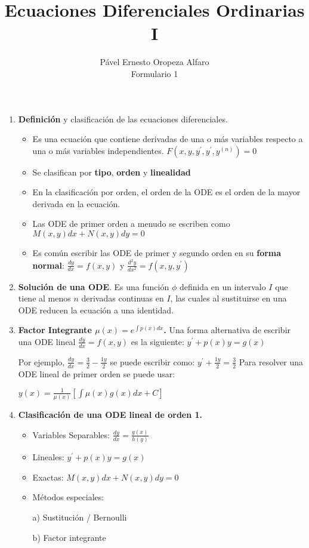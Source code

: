 \documentclass[twoside, twocolumn, 10pt]{article}
\title{Ecuaciones Diferenciales Ordinarias I}
\author{P\'avel Ernesto Oropeza Alfaro \\Formulario 1}
\begin{document}
\date{}
\maketitle
\thispagestyle{empty}
{\begin{small}
\begin{enumerate}
    \item \textbf{Definición} y clasificación de las ecuaciones diferenciales. 
\begin{itemize}
    \item Es una ecuación que contiene derivadas de una o más 
        variables respecto a una o más variables independientes.
        $F(x,y, y^{\prime},y^{\prime},y^{(n)})=0$
    \item Se clasifican por \textbf{tipo}, \textbf{orden} y \textbf{linealidad}
    \item En la clasificación por orden, el orden de la ODE es el orden de la
        mayor derivada en la ecuación.
    \item Las ODE de primer orden a menudo se escriben como 
        $M(x,y)dx + N(x,y) dy = 0$
    \item Es común escribir las ODE de primer y segundo orden en su \textbf{forma normal}:
        $\frac{dy}{dx}=f(x,y)$ y $\frac{d^{2}y}{dx^{2}}=f(x,y,y^{\prime})$
\end{itemize}

\item \textbf{Solución de una ODE}. Es una función $\phi$ definida en un intervalo $I$ que
    tiene al menos $n$ derivadas continuas en $I$, las cuales al sustituirse en
    una ODE reducen la ecuación a una identidad.

\item \textbf{Factor Integrante $\mu(x)=e^{\int p(x) dx}$.} Una forma alternativa de escribir una ODE lineal 
    $\frac{dy}{dx}=f(x,y)$ es la siguiente:
    $y^{\prime} + p(x)y=g(x)$

Por ejemplo, $\frac{dy}{dx}=\frac{3}{2}-\frac{1y}{2}$ se puede escribir como:
$y^{\prime} + \frac{1y}{2}=\frac{3}{2}$
Para resolver una ODE lineal de primer orden se puede usar: 
\begin{center}
$y(x) = \frac{1}{\mu(x)}[ \int \mu(x)  g(x) dx + C]$  
\end{center}
\item \textbf{Clasificación de una ODE lineal de orden 1.}
\begin{itemize}
    \item Variables Separables: $\frac{dy}{dx}=\frac{g(x)}{h(y)}$
    \item Lineales: $y^{\prime} + p(x)y=g(x)$
    \item Exactas: $M(x,y)dx + N(x,y) dy = 0$
    \item Métodos especiales:
    \item [a)] Sustitución / Bernoulli
    \item [b)] Factor integrante
\end{itemize} 


\end{enumerate}
\end{small}}
\end{document}
